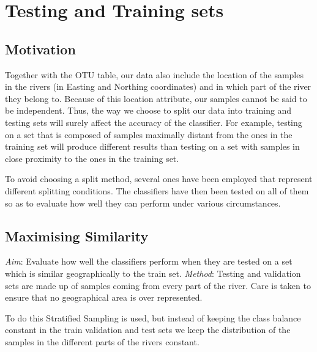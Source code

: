 \chapter{Testing and Training sets}

\ifpdf
    \graphicspath{{Chapter3/Figs/Raster/}{Chapter3/Figs/PDF/}{Chapter3/Figs/}}
\else
    \graphicspath{{Chapter3/Figs/Vector/}{Chapter3/Figs/}}
\fi
\section{Motivation}
Together with the OTU table, our data also include the location of the samples in the rivers (in Easting and Northing coordinates) and in which part of the river they belong to. Because of this location attribute, our samples cannot be said to be independent. Thus, the way we choose to split our data into training and testing sets will surely affect the accuracy of the classifier. For example, testing on a set that is composed of samples maximally distant from the ones in the training set will produce different results than testing on a set with samples in close proximity to the ones in the training set.


To avoid choosing a split method, several ones have been employed that represent different splitting conditions. The classifiers have then been tested on all of them so as to evaluate how well they can perform under various circumstances.





\section{Maximising Similarity}
\textit{Aim}: Evaluate how well the classifiers perform when they are tested on a set which is similar geographically to the train set.
\textit{Method}: Testing and validation sets are made up of samples coming from every part of the river. Care is taken to ensure that no geographical area is over represented. 

To do this Stratified Sampling is used, but instead of keeping the class balance constant in the train validation and test sets we keep the distribution of the samples in the different parts of the rivers constant.

